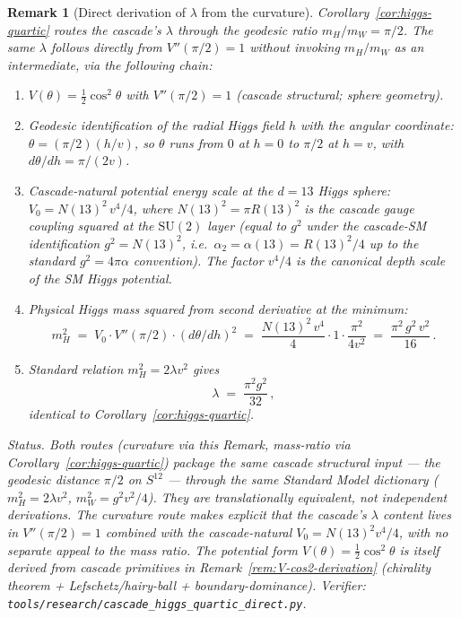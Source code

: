 \documentclass[12pt,a4paper]{article}
\newtheorem*{remark}{Remark}
\begin{document}
\begin{remark}[Direct derivation of $\lambda$ from the curvature]\label{rem:lambda-direct}
Corollary~\ref{cor:higgs-quartic} routes the cascade's $\lambda$ through the geodesic ratio $m_H/m_W = \pi/2$. The same $\lambda$ follows directly from $V''(\pi/2) = 1$ without invoking $m_H/m_W$ as an intermediate, via the following chain:
\begin{enumerate}[label=(\arabic*),nosep]
\item $V(\theta) = \tfrac{1}{2}\cos^2\theta$ with $V''(\pi/2) = 1$ (cascade structural; sphere geometry).
\item Geodesic identification of the radial Higgs field $h$ with the angular coordinate: $\theta = (\pi/2)(h/v)$, so $\theta$ runs from $0$ at $h=0$ to $\pi/2$ at $h=v$, with $d\theta/dh = \pi/(2v)$.
\item Cascade-natural potential energy scale at the $d=13$ Higgs sphere: $V_0 = N(13)^2 \, v^4/4$, where $N(13)^2 = \pi R(13)^2$ is the cascade gauge coupling squared at the $\mathrm{SU}(2)$ layer (equal to $g^2$ under the cascade-SM identification $g^2 = N(13)^2$, i.e.\ $\alpha_2 = \alpha(13) = R(13)^2/4$ up to the standard $g^2 = 4\pi\alpha$ convention). The factor $v^4/4$ is the canonical depth scale of the SM Higgs potential.
\item Physical Higgs mass squared from second derivative at the minimum:
\[
m_H^2 \;=\; V_0 \cdot V''(\pi/2) \cdot (d\theta/dh)^2 \;=\; \frac{N(13)^2\,v^4}{4} \cdot 1 \cdot \frac{\pi^2}{4v^2} \;=\; \frac{\pi^2\,g^2\,v^2}{16}\,.
\]
\item Standard relation $m_H^2 = 2\lambda v^2$ gives
\[
\lambda \;=\; \frac{\pi^2 g^2}{32}\,,
\]
identical to Corollary~\ref{cor:higgs-quartic}.
\end{enumerate}

\medskip\noindent\emph{Status.} Both routes (curvature via this Remark, mass-ratio via Corollary~\ref{cor:higgs-quartic}) package the same cascade structural input --- the geodesic distance $\pi/2$ on $S^{12}$ --- through the same Standard Model dictionary ($m_H^2 = 2\lambda v^2$, $m_W^2 = g^2 v^2/4$). They are translationally equivalent, not independent derivations. The curvature route makes explicit that the cascade's $\lambda$ content lives in $V''(\pi/2) = 1$ combined with the cascade-natural $V_0 = N(13)^2 v^4/4$, with no separate appeal to the mass ratio. The potential form $V(\theta) = \tfrac{1}{2}\cos^2\theta$ is itself derived from cascade primitives in Remark~\ref{rem:V-cos2-derivation} (chirality theorem + Lefschetz/hairy-ball + boundary-dominance). Verifier: \texttt{tools/research/cascade\_higgs\_quartic\_direct.py}.
\end{remark}
\end{document}
